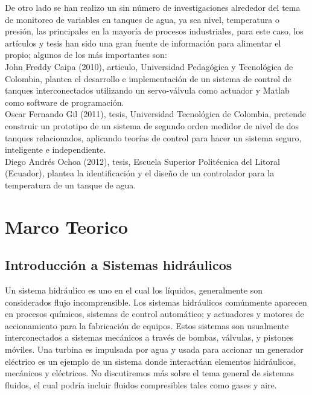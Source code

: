 \documentclass[a4paper,12pt,twoside]{proyectotanquesecci}
\begin{document}
De otro lado se han realizo un sin número de investigaciones alrededor del tema de monitoreo de variables en tanques de agua, ya sea nivel, temperatura o presión, las principales en la mayoría de procesos industriales, para este caso, los artículos y tesis han sido una gran fuente de información para alimentar el propio; algunos de los más importantes son:\\

John Freddy Caipa (2010), articulo, Universidad Pedagógica y Tecnológica de Colombia, plantea el desarrollo e implementación de un sistema de control de tanques interconectados utilizando un servo-válvula como actuador y Matlab como software de programación.\\

Oscar Fernando Gil (2011), tesis, Universidad Tecnológica de Colombia, pretende construir un prototipo de un sistema de segundo orden medidor de nivel de dos tanques relacionados, aplicando teorías de control para hacer un sistema seguro, inteligente e independiente.\\

Diego Andrés Ochoa (2012), tesis, Escuela Superior Politécnica del Litoral (Ecuador), plantea la identificación y el diseño de un controlador para la temperatura de un tanque de agua.\\









\chapter{Marco Teorico}

\section{Introducción a Sistemas hidráulicos}

Un sistema hidráulico es uno en el cual los líquidos, generalmente son considerados flujo incomprensible. Los sistemas hidráulicos comúnmente aparecen en procesos químicos, sistemas de control automático; y actuadores y motores de accionamiento para la fabricación de equipos. Estos sistemas son usualmente interconectados a sistemas mecánicos a través de bombas, válvulas, y pistones móviles. Una turbina es impulsada por agua y usada para accionar un generador eléctrico es un ejemplo de un sistema donde interactúan elementos hidráulicos, mecánicos y eléctricos. No discutiremos más sobre el tema general de sistemas fluidos, el cual podría incluir fluidos compresibles tales como gases y aire. \\
\end{document}
